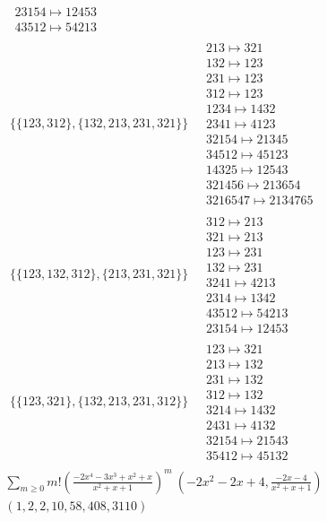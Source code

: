 \begin{scriptsize}
\begin{align}
\begin{matrix}
\\
23154 \mapsto 12453
\\
43512 \mapsto 54213
\end{matrix}
\\
\{\{123, 312\}, \{132, 213, 231, 321\}\}
\ 
&
\begin{matrix}
213 \mapsto 321
\\
132 \mapsto 123
\\
231 \mapsto 123
\\
312 \mapsto 123
\\
1234 \mapsto 1432
\\
2341 \mapsto 4123
\\
32154 \mapsto 21345
\\
34512 \mapsto 45123
\\
14325 \mapsto 12543
\\
321456 \mapsto 213654
\\
3216547 \mapsto 2134765
\end{matrix}
\\
\{\{123, 132, 312\}, \{213, 231, 321\}\}
\ 
&
\begin{matrix}
312 \mapsto 213
\\
321 \mapsto 213
\\
123 \mapsto 231
\\
132 \mapsto 231
\\
3241 \mapsto 4213
\\
2314 \mapsto 1342
\\
43512 \mapsto 54213
\\
23154 \mapsto 12453
\end{matrix}
\\
\{\{123, 321\}, \{132, 213, 231, 312\}\}
\ 
&
\begin{matrix}
123 \mapsto 321
\\
213 \mapsto 132
\\
231 \mapsto 132
\\
312 \mapsto 132
\\
3214 \mapsto 1432
\\
2431 \mapsto 4132
\\
32154 \mapsto 21543
\\
35412 \mapsto 45132
\end{matrix}
\end{align}
$$
\begin{matrix}
\sum_{m \geq 0} m! \left(
\frac{-2 x^{4} - 3 x^{3} + x^{2} + x}{x^{2} + x + 1}
\right)^m
\ 
\left(-2 x^{2} - 2 x + 4, \frac{-2 x - 4}{x^{2} + x + 1}\right)
\\
\left(1, 2, 2, 10, 58, 408, 3110\right)

\end{matrix}$$
\end{scriptsize}
